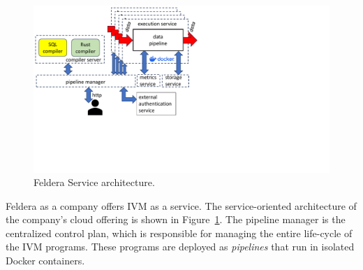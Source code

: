 \begin{figure}[h]
  \begin{center}
  \includegraphics[trim={0 2.5in 4.3in 0},clip,scale=.44]{services.pdf}
  \caption{\label{fig:service}Feldera Service architecture.}
  \end{center}
\end{figure}

Feldera as a company offers IVM as a service.  The service-oriented
architecture of the company's cloud offering is shown in
Figure~\ref{fig:service}.  The pipeline manager is the centralized
control plan, which is responsible for managing the entire life-cycle
of the IVM programs.  These programs are deployed as \emph{pipelines}
that run in isolated Docker containers.

